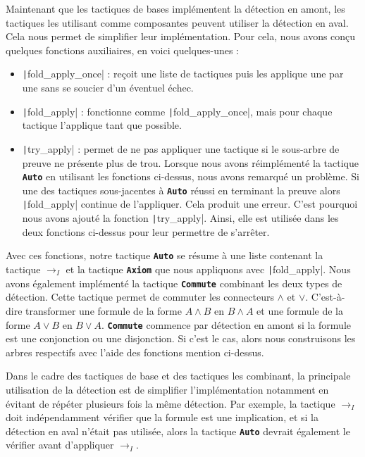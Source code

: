 \documentclass[french,titlepage]{article}
\newcommand{\textttbf}[1]{\texttt{\textbf{#1}}}
\begin{document}
Maintenant que les tactiques de bases implémentent la détection en amont, les tactiques les utilisant comme composantes peuvent utiliser la détection en aval. Cela nous permet de simplifier leur implémentation. Pour cela, nous avons conçu quelques fonctions auxiliaires, en voici quelques-unes :
\begin{itemize}
    \item \texttt|fold_apply_once| : reçoit une liste de tactiques puis les applique une par une sans se soucier d'un éventuel échec.
    \item \texttt|fold_apply| : fonctionne comme \texttt|fold_apply_once|, mais pour chaque tactique l'applique tant que possible.
    \item \texttt|try_apply| : permet de ne pas appliquer une tactique si le sous-arbre de preuve ne présente plus de trou. Lorsque nous avons réimplémenté la tactique \textttbf{Auto} en utilisant les fonctions ci-dessus, nous avons remarqué un problème. Si une des tactiques sous-jacentes à \textttbf{Auto} réussi en terminant la preuve alors \texttt|fold_apply| continue de l'appliquer. Cela produit une erreur. C'est pourquoi nous avons ajouté la fonction \texttt|try_apply|. Ainsi, elle est utilisée dans les deux fonctions ci-dessus pour leur permettre de s'arrêter.
\end{itemize}
Avec ces fonctions, notre tactique \textttbf{Auto} se résume à une liste contenant la tactique $\to_I$ et la tactique \textttbf{Axiom} que nous appliquons avec \texttt|fold_apply|. Nous avons également implémenté la tactique \textttbf{Commute} combinant les deux types de détection. Cette tactique permet de commuter les connecteurs $\land$ et $\lor$. C'est-à-dire transformer une formule de la forme $A \land B$ en $B \land A$ et une formule de la forme $A \lor B$ en $B \lor A$. \textttbf{Commute} commence par détection en amont si la formule est une conjonction ou une disjonction. Si c'est le cas, alors nous construisons les arbres respectifs avec l'aide des fonctions mention ci-dessus.

Dans le cadre des tactiques de base et des tactiques les combinant, la principale utilisation de la détection est de simplifier l'implémentation notamment en évitant de répéter plusieurs fois la même détection. Par exemple, la tactique $\to_I$ doit indépendamment vérifier que la formule est une implication, et si la détection en aval n'était pas utilisée, alors la tactique \textttbf{Auto} devrait également le vérifier avant d'appliquer $\to_I$.
\end{document}

